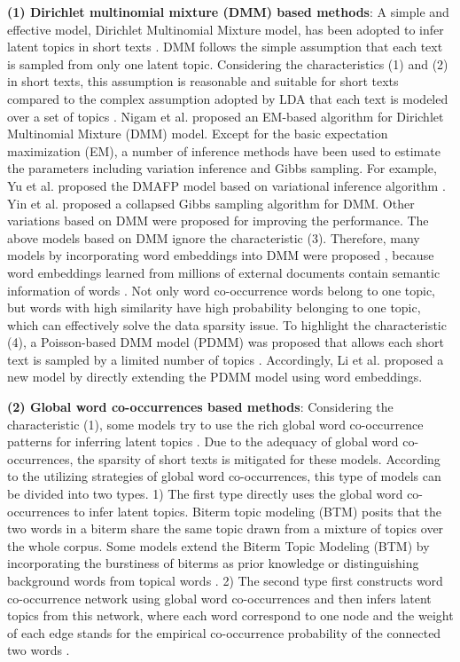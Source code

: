 \documentclass[10pt,journal,compsoc]{IEEEtran}
\begin{document}
\textbf {(1) Dirichlet multinomial mixture (DMM) based methods}: A simple and effective model, Dirichlet Multinomial Mixture model, has been adopted to infer latent topics in short texts \cite{yin2014dirichlet,zhao2011comparing}. DMM follows the simple assumption that each text is sampled from only one latent topic. Considering the characteristics (1) and (2) in short texts, this assumption is reasonable and suitable for short texts compared to the complex assumption adopted by LDA that each text is modeled over a set of topics \cite{quan2015short,yan2015probabilistic}. Nigam et al. \cite{nigam2000text} proposed an EM-based algorithm for Dirichlet Multinomial Mixture (DMM) model. Except for the basic expectation maximization (EM), a number of inference methods have been used to estimate the parameters including variation inference and Gibbs sampling. For example, Yu et al. \cite{yu2010document} proposed the DMAFP model based on variational inference algorithm \cite{huang2013dirichlet}. Yin et al. \cite{yin2014dirichlet} proposed a collapsed Gibbs sampling algorithm for DMM. Other variations based on DMM \cite{qiang2018short,yin2016text,yin2018text} were proposed for improving the performance. The above models based on DMM ignore the characteristic (3). Therefore, many models by incorporating word embeddings into DMM were proposed \cite{nguyen2015improving,li2016topic}, because word embeddings learned from millions of external documents contain semantic information of words \cite{Mikolov2013Dis}. Not only word co-occurrence words belong to one topic, but words with high similarity have high probability belonging to one topic, which can effectively solve the data sparsity issue. To highlight the characteristic (4), a Poisson-based DMM model (PDMM) was proposed that allows each short text is sampled by a limited number of topics \cite{li2017enhancing}. Accordingly, Li et al. \cite{li2017enhancing} proposed a new model by directly extending the PDMM model using word embeddings.

\textbf{(2) Global word co-occurrences based methods}: Considering the characteristic (1), some models try to use the rich global word co-occurrence patterns for inferring latent topics \cite{cheng2014btm,zuo2016word}. Due to the adequacy of global word co-occurrences, the sparsity of short texts is mitigated for these models. According to the utilizing strategies of global word co-occurrences, this type of models can be divided into two types. 1) The first type directly uses the global word co-occurrences to infer latent topics. Biterm topic modeling (BTM) \cite{cheng2014btm} posits that the two words in a biterm share the same topic drawn from a mixture of topics over the whole corpus. Some models extend the Biterm Topic Modeling (BTM) by incorporating the burstiness of biterms as prior knowledge \cite{yan2015probabilistic} or distinguishing background words from topical words \cite{chen2015user}. 2) The second type first constructs word co-occurrence network using global word co-occurrences and then infers latent topics from this network, where each word correspond to one node and the weight of each edge stands for the empirical co-occurrence probability of the connected two words \cite{zuo2016word, wang2017learning}. 
\end{document}
